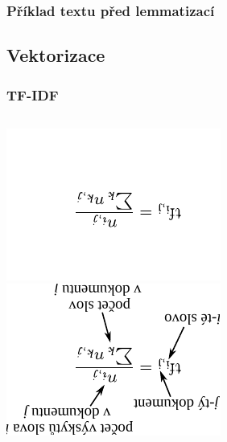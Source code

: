 \documentclass{beamer}
\begin{document}
\begin{frame}
\frametitle{Příklad textu před lemmatizací}
  \begin{overprint}
    \resizebox{.51\textwidth}{!}{}
    \resizebox{\textwidth}{!}{}
  \end{overprint}
\end{frame}


\subsection{Vektorizace}

\begin{frame}
\frametitle{TF-IDF}

\begin{columns}
    \begin{overprint}
      \centering\includegraphics[width=.6\textwidth,height=\textheight,angle=180,keepaspectratio]{figures/tf.pdf}
      \centering\includegraphics[width=.6\textwidth,height=\textheight,angle=180,keepaspectratio]{figures/tf_described.pdf}
    \end{overprint}


\end{columns}
\end{frame}
\end{document}
